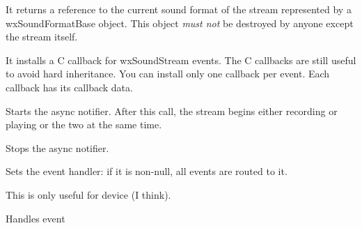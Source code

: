 \label{wxsoundstreamgetsoundformat}

It returns a reference to the current sound format of the stream represented by a
wxSoundFormatBase object. This object {\it must not} be destroyed by anyone except
the stream itself.

\label{wxsoundstreamregister}

It installs a C callback for wxSoundStream events. The C callbacks are still useful
to avoid hard inheritance. You can install only one callback per event. Each callback
has its callback data.

\label{wxsoundstreamstartproduction}


Starts the async notifier. After this call, the stream begins either 
recording or playing or the two at the same time.

\label{wxsoundstreamstopproduction}


Stops the async notifier.


\label{wxsoundstreamseteventhandler}


Sets the event handler: if it is non-null, all events are routed to it.


\label{wxsoundstreamgeterror}


\label{wxsoundstreamgetlastaccess}


\label{wxsoundstreamqueuefilled}

This is only useful for device (I think).


\label{wxsoundstreamonsoundevent}

Handles event
